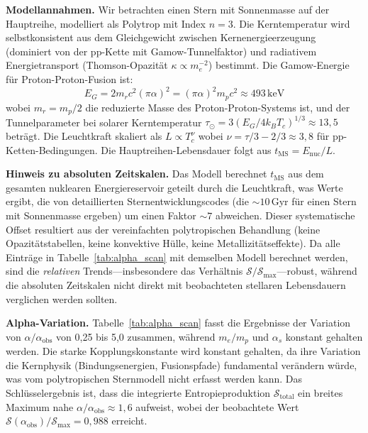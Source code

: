 \documentclass[12pt,a4paper]{article}
\theoremstyle{remark}
\begin{document}
\textbf{Modellannahmen.} Wir betrachten einen Stern mit Sonnenmasse auf der Hauptreihe, modelliert als Polytrop mit Index $n = 3$. Die Kerntemperatur wird selbstkonsistent aus dem Gleichgewicht zwischen Kernenergieerzeugung (dominiert von der pp-Kette mit Gamow-Tunnelfaktor) und radiativem Energietransport (Thomson-Opazit\"at $\kappa \propto m_e^{-2}$) bestimmt. Die Gamow-Energie f\"ur Proton-Proton-Fusion ist:
\begin{equation}
E_G = 2 m_r c^2 (\pi \alpha)^2 = (\pi \alpha)^2 m_p c^2 \approx 493\,\text{keV}
\end{equation}
wobei $m_r = m_p/2$ die reduzierte Masse des Proton-Proton-Systems ist, und der Tunnelparameter bei solarer Kerntemperatur $\tau_\odot = 3(E_G / 4 k_B T_c)^{1/3} \approx 13{,}5$ betr\"agt. Die Leuchtkraft skaliert als $L \propto T_c^{\nu}$ wobei $\nu = \tau/3 - 2/3 \approx 3{,}8$ f\"ur pp-Ketten-Bedingungen. Die Hauptreihen-Lebensdauer folgt aus $t_{\text{MS}} = E_{\text{nuc}} / L$.

\textbf{Hinweis zu absoluten Zeitskalen.} Das Modell berechnet $t_{\text{MS}}$ aus dem gesamten nuklearen Energiereservoir geteilt durch die Leuchtkraft, was Werte ergibt, die von detaillierten Sternentwicklungscodes (die ${\sim}10\,$Gyr f\"ur einen Stern mit Sonnenmasse ergeben) um einen Faktor ${\sim}7$ abweichen. Dieser systematische Offset resultiert aus der vereinfachten polytropischen Behandlung (keine Opazit\"atstabellen, keine konvektive H\"ulle, keine Metallizit\"atseffekte). Da alle Eintr\"age in Tabelle~\ref{tab:alpha_scan} mit demselben Modell berechnet werden, sind die \emph{relativen} Trends---insbesondere das Verh\"altnis $\mathcal{S}/\mathcal{S}_{\text{max}}$---robust, w\"ahrend die absoluten Zeitskalen nicht direkt mit beobachteten stellaren Lebensdauern verglichen werden sollten.

\textbf{Alpha-Variation.} Tabelle~\ref{tab:alpha_scan} fasst die Ergebnisse der Variation von $\alpha / \alpha_{\text{obs}}$ von 0,25 bis 5,0 zusammen, w\"ahrend $m_e/m_p$ und $\alpha_s$ konstant gehalten werden. Die starke Kopplungskonstante wird konstant gehalten, da ihre Variation die Kernphysik (Bindungsenergien, Fusionspfade) fundamental ver\"andern w\"urde, was vom polytropischen Sternmodell nicht erfasst werden kann. Das Schl\"usselergebnis ist, dass die integrierte Entropieproduktion $\mathcal{S}_{\text{total}}$ ein breites Maximum nahe $\alpha / \alpha_{\text{obs}} \approx 1{,}6$ aufweist, wobei der beobachtete Wert $\mathcal{S}(\alpha_{\text{obs}}) / \mathcal{S}_{\text{max}} = 0{,}988$ erreicht.
\end{document}

